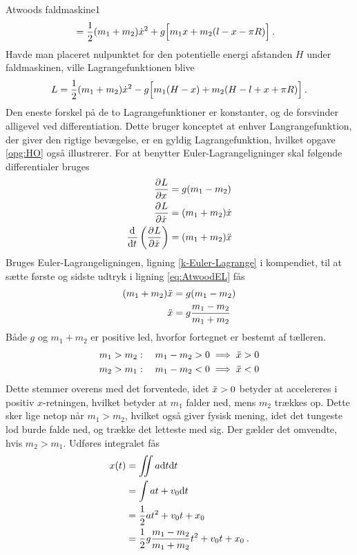\begin{opgave}{Atwoods faldmaskine}{1}
\begin{align*}
	&= \frac{1}{2}(m_1+m_2)\dt{x}^2 + g\Big[m_1x + m_2(l - x - \pi R)\Big] \: .
\end{align*}
Havde man placeret nulpunktet for den potentielle energi afstanden $H$ under faldmaskinen, ville Lagrangefunktionen blive
\begin{align*}
	L = \frac{1}{2}(m_1+m_2)\dt{x}^2 - g\Big[m_1(H-x) + m_2(H - l + x + \pi R)\Big] \: .
\end{align*}
Den eneste forskel på de to Lagrangefunktioner er konstanter, og de forsvinder alligevel ved differentiation. Dette bruger konceptet at enhver Langrangefunktion, der giver den rigtige bevægelse, er en gyldig Lagrangefunktion, hvilket opgave \ref{opg:HO} også illustrerer.
\opg For at benytter Euler-Lagrangeligninger skal følgende differentialer bruges
\begin{align} \label{eq:AtwoodEL}
	\pdif{x}{L} &= g(m_1 - m_2) \\
	\pdif{\dt{x}}{L} &= (m_1 + m_2)\dt{x} \\
	\el{\dt{x}} &= (m_1 + m_2)\ddt{x}
\end{align}
Bruges Euler-Lagrangeligningen, ligning \ref{k-Euler-Lagrange} i kompendiet, til at sætte første og sidste udtryk i ligning \eqref{eq:AtwoodEL} fås
\begin{align*}
	(m_1 + m_2)\ddt{x} &= g(m_1 - m_2) \\
	\ddt{x} &= g\frac{m_1 - m_2}{m_1 + m_2}
\end{align*}
\opg Både $g$ og $m_1+m_2$ er positive led, hvorfor fortegnet er bestemt af tælleren.
\begin{align*}
	m_1>m_2: \quad m_1-m_2>0 \implies \ddt{x}>0 \\
	m_2>m_1: \quad m_1-m_2<0 \implies \ddt{x}<0
\end{align*}
Dette stemmer overens med det forventede, idet $\ddt{x}>0$ betyder at accelereres i positiv $x$-retningen, hvilket betyder at $m_1$ falder ned, mens $m_2$ trækkes op. Dette sker lige netop når $m_1>m_2$, hvilket også giver fysisk mening, idet det tungeste lod burde falde ned, og trække det letteste med sig. Der gælder det omvendte, hvis $m_2>m_1$.
\opg Udføres integralet fås
\begin{align*}
	x(t) &= \iint a\d t \d t \\
	&= \int at + v_0 \d t \\
	&= \frac{1}{2}at^2 + v_0t + x_0 \\
	&= \frac{1}{2}g\frac{m_1 - m_2}{m_1 + m_2}t^2 + v_0t + x_0 \: .
\end{align*}
\end{opgave}
